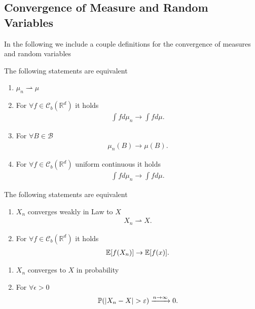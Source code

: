 \subsection{Convergence of Measure and Random Variables}
In the following we include a couple definitions for the convergence of measures and random variables
\begin{definition}
 The following statements are equivalent   
 \begin{enumerate}
   \item $\mu_n \rightharpoonup \mu $
   \item For $\forall  f \in  \mathcal{C}_b(\mathbb{R}^{d} )$ it holds 
 \begin{align*}
  \int f d\mu_n \to \int  f d\mu 
 .\end{align*}
\item For $\forall  B \in \mathcal{B} $  
  \begin{align*}
    \mu_n(B) \to  \mu(B)
  .\end{align*}
\item For $\forall f \in  \mathcal{C}_b(\mathbb{R}^{d} )$ uniform continuous it holds 
  \begin{align*}
    \int  f d\mu_n \to  \int f d\mu 
  .\end{align*}
 \end{enumerate}
\end{definition}
\begin{definition}
 The following statements are equivalent  
 \begin{enumerate}
   \item $X_n$ converges weakly in Law to $X$  
     \begin{align*}
      X_n \rightharpoonup X
     .\end{align*}
   \item For $\forall f \in  \mathcal{C}_b(\mathbb{R}^{d} )$ it holds 
     \begin{align*}
       \mathbb{E}[f(X_n)] \to \mathbb{E}[f(x)]
     .\end{align*}
 \end{enumerate}
 \begin{enumerate}
   \item $X_n$ converges to $X$ in probability
   \item For $\forall \epsilon  >0$ 
     \begin{align*}
       \mathbb{P}(\lvert X_n - X\rvert >\varepsilon ) \xrightarrow{n\to \infty} 0
     .\end{align*}
 \end{enumerate}
\end{definition}
